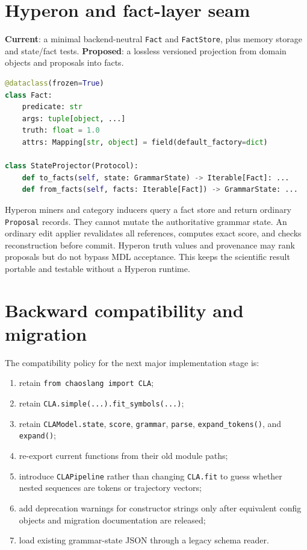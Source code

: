 \documentclass[11pt]{article}
\newcommand{\Current}{\textbf{Current}}
\newcommand{\Proposed}{\textbf{Proposed}}
\begin{document}
\section{Hyperon and fact-layer seam}

\Current: a minimal backend-neutral \texttt{Fact} and \texttt{FactStore}, plus
memory storage and state/fact tests. \Proposed: a lossless versioned projection
from domain objects and proposals into facts.

\begin{lstlisting}[language=Python]
@dataclass(frozen=True)
class Fact:
    predicate: str
    args: tuple[object, ...]
    truth: float = 1.0
    attrs: Mapping[str, object] = field(default_factory=dict)

class StateProjector(Protocol):
    def to_facts(self, state: GrammarState) -> Iterable[Fact]: ...
    def from_facts(self, facts: Iterable[Fact]) -> GrammarState: ...
\end{lstlisting}

Hyperon miners and category inducers query a fact store and return ordinary
\texttt{Proposal} records. They cannot mutate the authoritative grammar state.
An ordinary edit applier revalidates all references, computes exact score, and
checks reconstruction before commit. Hyperon truth values and provenance may
rank proposals but do not bypass MDL acceptance. This keeps the scientific
result portable and testable without a Hyperon runtime.

\section{Backward compatibility and migration}

The compatibility policy for the next major implementation stage is:
\begin{enumerate}[nosep]
\item retain \texttt{from chaoslang import CLA};
\item retain \texttt{CLA.simple(...).fit\_symbols(...)};
\item retain \texttt{CLAModel.state}, \texttt{score}, \texttt{grammar},
  \texttt{parse}, \texttt{expand\_tokens()}, and \texttt{expand()};
\item re-export current functions from their old module paths;
\item introduce \texttt{CLAPipeline} rather than changing \texttt{CLA.fit} to
  guess whether nested sequences are tokens or trajectory vectors;
\item add deprecation warnings for constructor strings only after equivalent
  config objects and migration documentation are released;
\item load existing grammar-state JSON through a legacy schema reader.
\end{enumerate}
\end{document}
